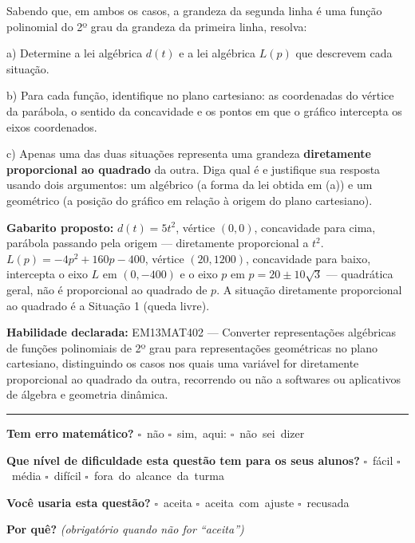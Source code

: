 \documentclass[11pt,a4paper]{article}
\begin{document}
\begin{samepage}
Sabendo que, em ambos os casos, a grandeza da segunda linha é uma função polinomial do 2º grau da grandeza da primeira linha, resolva:

a) Determine a lei algébrica $d(t)$ e a lei algébrica $L(p)$ que descrevem cada situação.

b) Para cada função, identifique no plano cartesiano: as coordenadas do vértice da parábola, o sentido da concavidade e os pontos em que o gráfico intercepta os eixos coordenados.

c) Apenas uma das duas situações representa uma grandeza \textbf{diretamente proporcional ao quadrado} da outra. Diga qual é e justifique sua resposta usando dois argumentos: um algébrico (a forma da lei obtida em (a)) e um geométrico (a posição do gráfico em relação à origem do plano cartesiano).

\textbf{Gabarito proposto:} $d(t)=5t^2$, vértice $(0,0)$, concavidade para cima, parábola passando pela origem — diretamente proporcional a $t^2$. $L(p)=-4p^2+160p-400$, vértice $(20,1200)$, concavidade para baixo, intercepta o eixo $L$ em $(0,-400)$ e o eixo $p$ em $p=20\pm10\sqrt3$ — quadrática geral, não é proporcional ao quadrado de $p$. A situação diretamente proporcional ao quadrado é a Situação 1 (queda livre).

\textbf{Habilidade declarada:} EM13MAT402 --- Converter representações algébricas de funções polinomiais de 2º grau para representações geométricas no plano cartesiano, distinguindo os casos nos quais uma variável for diretamente proporcional ao quadrado da outra, recorrendo ou não a softwares ou aplicativos de álgebra e geometria dinâmica.
\end{samepage}

\noindent\rule{\linewidth}{0.4pt}
\textbf{Tem erro matemático?}\quad
\mbox{$\square$~não} \quad \mbox{$\square$~sim, aqui:} \underline{\hspace{5cm}}
\quad \mbox{$\square$~não sei dizer}

\textbf{Que nível de dificuldade esta questão tem para os seus alunos?}\quad
\mbox{$\square$~fácil} \quad \mbox{$\square$~média} \quad
\mbox{$\square$~difícil} \quad \mbox{$\square$~fora do alcance da turma}

\textbf{Você usaria esta questão?}\quad
\mbox{$\square$~aceita} \quad \mbox{$\square$~aceita com ajuste} \quad
\mbox{$\square$~recusada}

\textbf{Por quê?} \emph{(obrigatório quando não for ``aceita'')}

\underline{\hspace{\linewidth}}
\end{document}
